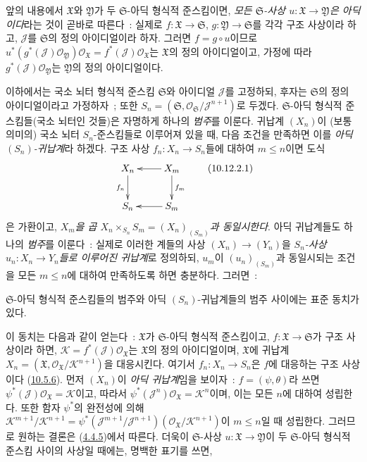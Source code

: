 앞의 내용에서 $\mathfrak{X}$와 $\mathfrak{Y}$가 두
$\mathfrak{S}$-아딕 형식적 준스킴이면,
\emph{모든 $\mathfrak{S}$-사상
$u:\mathfrak{X}\to\mathfrak{Y}$은 아딕이다}라는 것이 곧바로 따른다~:
실제로 $f:\mathfrak{X}\to\mathfrak{S}$,
$g:\mathfrak{Y}\to\mathfrak{S}$를 각각 구조 사상이라 하고,
$\mathscr{J}$를 $\mathfrak{S}$의 정의 아이디얼이라 하자. 그러면
$f=g\circ u$이므로
$u^*(g^*(\mathscr{J})\mathscr{O}_{\mathfrak{Y}})
\mathscr{O}_{\mathfrak{X}}=f^*(\mathscr{J})
\mathscr{O}_{\mathfrak{X}}$는 $\mathfrak{X}$의 정의 아이디얼이고,
가정에 따라 $g^*(\mathscr{J})\mathscr{O}_{\mathfrak{Y}}$는
$\mathfrak{Y}$의 정의 아이디얼이다.

\begin{env}[10.12.2]
\label{I.10.12.2-ko}
이하에서는 국소 뇌터 형식적 준스킴 $\mathfrak{S}$와 아이디얼
$\mathscr{J}$를 고정하되, 후자는 $\mathfrak{S}$의 정의 아이디얼이라고
가정하자~; 또한
$S_n=(\mathfrak{S},\mathscr{O}_{\mathfrak{S}}/\mathscr{J}^{n+1})$로
두겠다. $\mathfrak{S}$-아딕 형식적 준스킴들(국소 뇌터인 것들)은
자명하게 하나의 \emph{범주}를 이룬다. 귀납계 $(X_n)$이 (보통 의미의)
국소 뇌터 $S_n$-준스킴들로 이루어져 있을 때, 다음 조건을 만족하면
이를 \emph{아딕 $(S_n)$-귀납계}라 하겠다. 구조 사상
$f_n:X_n\to S_n$들에 대하여 $m\leq n$이면 도식
\[
  \label{I.10.12.2.1-ko}
  \xymatrix{
    X_n \ar[d]_{f_n}
    & X_m \ar[l] \ar[d]^{f_m}\\
    S_n
    & S_m \ar[l]
  }
  \tag{10.12.2.1}
\]
은 가환이고, \emph{$X_m$을 곱
$X_n\times_{S_n}S_m=(X_n)_{(S_m)}$과 동일시한다}. 아딕 귀납계들도
하나의 \emph{범주}를 이룬다~: 실제로 이러한 계들의 사상
$(X_n)\to(Y_n)$을 \emph{$S_n$-사상 $u_n:X_n\to Y_n$들로 이루어진
귀납계}로 정의하되, $u_m$이 $(u_n)_{(S_m)}$과 동일시되는 조건을
모든 $m\leq n$에 대하여 만족하도록 하면 충분하다. 그러면~:
\end{env}

\begin{theorem}[10.12.3]
\label{I.10.12.3-ko}
$\mathfrak{S}$-아딕 형식적 준스킴들의 범주와 아딕
$(S_n)$-귀납계들의 범주 사이에는 표준 동치가 있다.
\end{theorem}

이 동치는 다음과 같이 얻는다~: $\mathfrak{X}$가
$\mathfrak{S}$-아딕 형식적 준스킴이고,
$f:\mathfrak{X}\to\mathfrak{S}$가 구조 사상이라 하면,
$\mathscr{K}=f^*(\mathscr{J})\mathscr{O}_{\mathfrak{X}}$는
$\mathfrak{X}$의 정의 아이디얼이며, $\mathfrak{X}$에 귀납계
$X_n=(\mathfrak{X},\mathscr{O}_{\mathfrak{X}}/\mathscr{K}^{n+1})$을
대응시킨다. 여기서 $f_n:X_n\to S_n$은 $f$에 대응하는 구조 사상이다
(\hyperref[I.10.5.6-ko]{10.5.6}). 먼저 $(X_n)$이
\emph{아딕 귀납계}임을 보이자~: $f=(\psi,\theta)$라 쓰면
$\psi^*(\mathscr{J})\mathscr{O}_{\mathfrak{X}}=\mathscr{K}$이고, 따라서
$\psi^*(\mathscr{J}^n)\mathscr{O}_{\mathfrak{X}}=\mathscr{K}^n$이며, 이는
모든 $n$에 대하여 성립한다.
또한 함자 $\psi^*$의 완전성에 의해
$\mathscr{K}^{m+1}/\mathscr{K}^{n+1}
=\psi^*(\mathscr{J}^{m+1}/\mathscr{J}^{n+1})
(\mathscr{O}_{\mathfrak{X}}/\mathscr{K}^{n+1})$이 $m\leq n$일 때
성립한다. 그러므로 원하는 결론은
(\hyperref[I.4.4.5-ko]{4.4.5})에서 따른다. 더욱이
$\mathfrak{S}$-사상 $u:\mathfrak{X}\to\mathfrak{Y}$이 두
$\mathfrak{S}$-아딕 형식적 준스킴 사이의 사상일 때에는, 명백한 표기를 쓰면,


